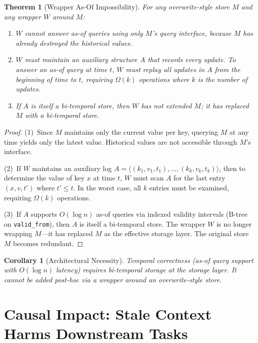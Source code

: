 \documentclass{article}
\newtheorem{theorem}{Theorem}
\newtheorem{corollary}{Corollary}
\begin{document}
\begin{theorem}[Wrapper As-Of Impossibility]
\label{thm:impossibility}
For any overwrite-style store $M$ and any wrapper $W$ around $M$:
\begin{enumerate}
\item $W$ cannot answer as-of queries using only $M$'s query interface, because $M$ has already destroyed the historical values.
\item $W$ must maintain an auxiliary structure $A$ that records every update. To answer an as-of query at time $t$, $W$ must replay all updates in $A$ from the beginning of time to $t$, requiring $\Omega(k)$ operations where $k$ is the number of updates.
\item If $A$ is itself a bi-temporal store, then $W$ has not extended $M$; it has replaced $M$ with a bi-temporal store.
\end{enumerate}
\end{theorem}

\begin{proof}
(1)~Since $M$ maintains only the current value per key, querying $M$ at any time yields only the latest value. Historical values are not accessible through $M$'s interface.

(2)~If $W$ maintains an auxiliary log $A = \langle (k_1, v_1, t_1), \ldots, (k_k, v_k, t_k) \rangle$, then to determine the value of key $x$ at time $t$, $W$ must scan $A$ for the last entry $(x, v, t')$ where $t' \leq t$. In the worst case, all $k$ entries must be examined, requiring $\Omega(k)$ operations.

(3)~If $A$ supports $O(\log n)$ as-of queries via indexed validity intervals (B-tree on \texttt{valid\_from}), then $A$ is itself a bi-temporal store. The wrapper $W$ is no longer wrapping $M$---it has replaced $M$ as the effective storage layer. The original store $M$ becomes redundant.
\end{proof}

\begin{corollary}[Architectural Necessity]
\label{cor:arch}
Temporal correctness (as-of query support with $O(\log n)$ latency) requires bi-temporal storage at the \emph{storage layer}. It cannot be added post-hoc via a wrapper around an overwrite-style store.
\end{corollary}

\section{Causal Impact: Stale Context Harms Downstream Tasks}
\label{sec:causal}
\end{document}
